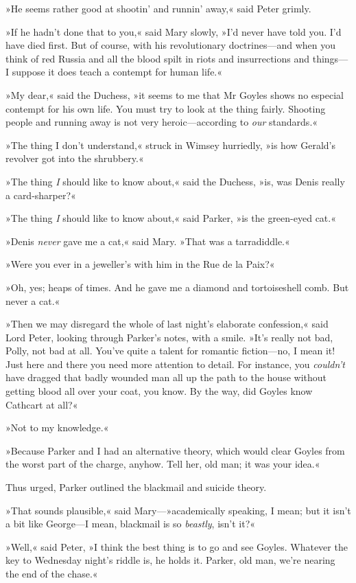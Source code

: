 »He seems rather good at shootin' and runnin' away,« said Peter grimly.

»If he hadn't done that to you,« said Mary slowly, »I'd never have told you. I'd have died first. But of course, with his revolutionary doctrines—and when you think of red Russia and all the blood spilt in riots and insurrections and things—I suppose it does teach a contempt for human life.«

»My dear,« said the Duchess, »it seems to me that Mr Goyles shows no especial contempt for his own life. You must try to look at the thing fairly. Shooting people and running away is not very heroic—according to \textit{our} standards.«

»The thing I don't understand,« struck in Wimsey hurriedly, »is how Gerald's revolver got into the shrubbery.«

»The thing \textit{I} should like to know about,« said the Duchess, »is, was Denis really a card-sharper?«

»The thing \textit{I} should like to know about,« said Parker, »is the green-eyed cat.«

»Denis \textit{never} gave me a cat,« said Mary. »That was a tarradiddle.«

»Were you ever in a jeweller's with him in the Rue de la Paix?«

»Oh, yes; heaps of times. And he gave me a diamond and tortoiseshell comb. But never a cat.«

»Then we may disregard the whole of last night's elaborate confession,« said Lord Peter, looking through Parker's notes, with a smile. »It's really not bad, Polly, not bad at all. You've quite a talent for romantic fiction—no, I mean it! Just here and there you need more attention to detail. For instance, you \textit{couldn't} have dragged that badly wounded man all up the path to the house without getting blood all over your coat, you know. By the way, did Goyles know Cathcart at all?«

»Not to my knowledge.«

»Because Parker and I had an alternative theory, which would clear Goyles from the worst part of the charge, anyhow. Tell her, old man; it was your idea.«

Thus urged, Parker outlined the blackmail and suicide theory.

»That sounds plausible,« said Mary—»academically speaking, I mean; but it isn't a bit like George—I mean, blackmail is so \textit{beastly}, isn't it?«

»Well,« said Peter, »I think the best thing is to go and see Goyles.  Whatever the key to Wednesday night's riddle is, he holds it. Parker, old man, we're nearing the end of the chase.«
